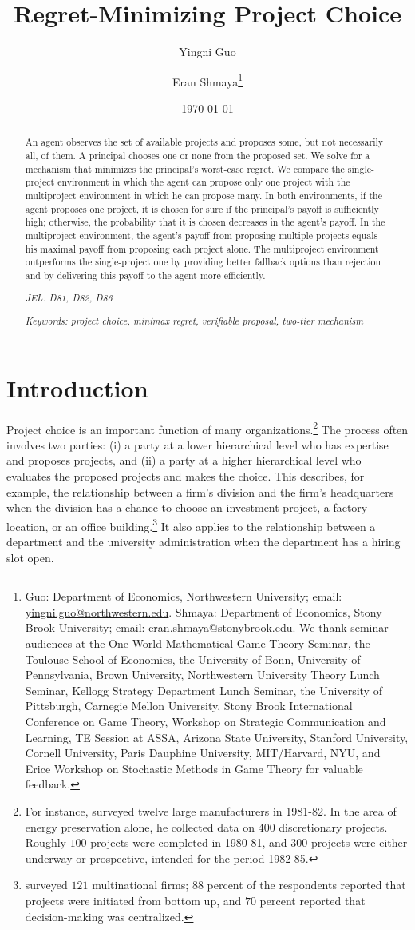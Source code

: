 \documentclass[12pt,english]{article}
\title{Regret-Minimizing Project Choice}
\author{Yingni Guo \and Eran Shmaya\thanks{Guo: Department of Economics, Northwestern University; email: \href{mailto:yingni.guo@northwestern.edu}{yingni.guo@northwestern.edu}. Shmaya: Department of Economics, Stony Brook University; email: \href{mailto:eran.shmaya@stonybrook.edu}{eran.shmaya@stonybrook.edu}. We thank seminar audiences at the One World Mathematical Game Theory Seminar, the Toulouse School of Economics, the University of Bonn, University of Pennsylvania, Brown University, Northwestern University Theory Lunch Seminar, Kellogg Strategy Department Lunch Seminar, the University of Pittsburgh, Carnegie Mellon University, Stony Brook International Conference on Game Theory, Workshop on Strategic Communication and Learning, TE Session at ASSA, Arizona State University, Stanford University, Cornell University, Paris Dauphine University, MIT/Harvard, NYU, and Erice Workshop on Stochastic Methods in Game Theory for valuable feedback.}}
\date{\today}
\theoremstyle{remark}
\theoremstyle{plain}
\theoremstyle{definition}
\begin{document}
\maketitle

\begin{abstract} 

An agent observes the set of available projects and proposes some, but not necessarily all, of them. A principal chooses one or none from the proposed set. We solve for a mechanism that minimizes the principal's worst-case regret. We compare the single-project environment in which the agent can propose only one project with the multiproject environment in which he can propose many. In both environments, if the agent proposes one project, it is chosen for sure if the principal's payoff is sufficiently high; otherwise, the probability that it is chosen decreases in the agent's payoff. In the multiproject environment, the agent's payoff from proposing multiple projects equals his maximal payoff from proposing each project alone. The multiproject environment outperforms the single-project one by providing better fallback options than rejection and by delivering this payoff to the agent more efficiently. 


\emph{JEL: D81, D82, D86}

\emph{Keywords: project choice, minimax regret, verifiable proposal, two-tier mechanism} %
\end{abstract}


\section{Introduction}


Project choice is an important function of many organizations.\footnote{For instance, \cite{Ross1986} surveyed twelve large manufacturers in 1981-82. In the area of energy preservation alone, he collected data on $400$ discretionary projects. Roughly $100$ projects were completed in 1980-81, and $300$ projects were either underway or prospective, intended for the period 1982-85.} The process often involves two parties: (i) a party at a lower hierarchical level who has expertise and proposes projects, and (ii) a party at a higher hierarchical level who evaluates the proposed projects and makes the choice. This describes, for example, the relationship between a firm's division and the firm's headquarters when the division has a chance to choose an investment project, a factory location, or an office building.\footnote{\cite{StanleyBlock1984} surveyed $121$ multinational firms; $88$ percent of the respondents reported that projects were initiated from bottom up, and $70$ percent reported that decision-making was centralized.} It also applies to the relationship between a department and the university administration when the department has a hiring slot open. 
\end{document}
